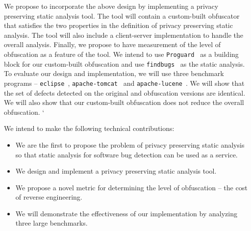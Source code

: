 \documentclass[twocolumn]{article}
\begin{document}

We propose to incorporate the above design by implementing a privacy preserving static analysis tool. 
The tool will contain a custom-built obfuscator that satisfies the two properties in the definition 
of privacy preserving static analysis. The tool will also include a client-server implementation to handle 
the overall analysis. Finally, we propose to have measurement of the level of obfuscation as a feature of the tool. 
We intend to use {\tt Proguard}~\cite{proguard} as a building block for our custom-built obfuscation and use 
{\tt findbugs}~\cite{findbugs} as the static analysis. 
To evaluate our design and implementation, we will use three benchmark programs -- {\tt eclipse}~\cite{eclipse}, 
{\tt apache-tomcat}~\cite{tomcat} and {\tt apache-lucene}~\cite{lucene}. We will 
show that the set of defects detected on the original and obfuscation versions are identical. 
We will also show that our custom-built obfuscation does not reduce the overall obfuscation. `

We intend to make the following technical contributions: 

\begin{itemize}
\item We are the first to propose the problem of privacy preserving static analysis so that static analysis for
      software bug detection can be used as a service. 
\item We design and implement a privacy preserving static analysis tool. 
\item We propose a novel metric for determining the level of obfuscation -- the cost of reverse engineering. 
\item We will demonstrate the effectiveness of our implementation by analyzing three large benchmarks. 
\end{itemize}
\end{document}
